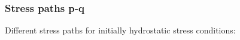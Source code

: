 \documentclass[notes]{beamer}
\begin{document}
\begin{frame}
\frametitle{Stress paths p-q}
Different stress paths for initially hydrostatic stress conditions:
\end{frame}
\end{document}
